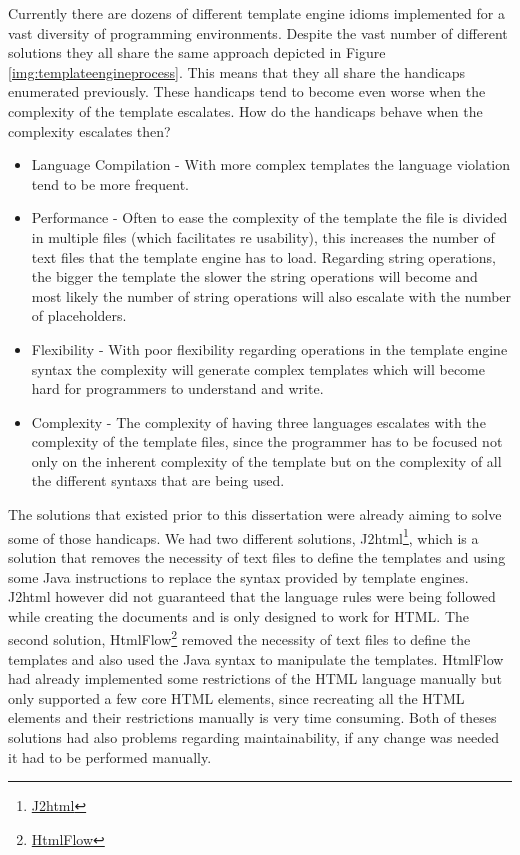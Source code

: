 \noindent
Currently there are dozens of different template engine idioms implemented for a vast diversity of programming environments. Despite the vast number of different solutions they all share the same approach depicted in Figure \ref{img:templateengineprocess}. This means that they all share the handicaps enumerated previously. These handicaps tend to become even worse when the complexity of the template escalates. How do the handicaps behave when the complexity escalates then?

\begin{itemize}
	\item Language Compilation - With more complex templates the language violation tend to be more frequent.
	\item Performance - Often to ease the complexity of the template the file is divided in multiple files (which facilitates re usability), this increases the number of text files that the template engine has to load. Regarding string operations, the bigger the template the slower the string operations will become and most likely the number of string operations will also escalate with the number of placeholders.
	\item Flexibility - With poor flexibility regarding operations in the template engine syntax the complexity will generate complex templates which will become hard for programmers to understand and write.
	\item Complexity - The complexity of having three languages escalates with the complexity of the template files, since the programmer has to be focused not only on the inherent complexity of the template but on the complexity of all the different syntaxs that are being used.
\end{itemize}

\noindent
The solutions that existed prior to this dissertation were already aiming to solve some of those handicaps. We had two different solutions, J2html\footnote{\href{https://j2html.com/}{J2html}}, which is a solution that removes the necessity of text files to define the templates and using some Java instructions to replace the syntax provided by template engines. J2html however did not guaranteed that the language rules were being followed while creating the documents and is only designed to work for \ac{HTML}. The second solution, HtmlFlow\footnote{\href{https://github.com/xmlet/HtmlFlow}{HtmlFlow}} removed the necessity of text files to define the templates and also used the Java syntax to manipulate the templates. HtmlFlow had already implemented some restrictions of the \ac{HTML} language manually but only supported a few core \ac{HTML} elements, since recreating all the \ac{HTML} elements and their restrictions manually is very time consuming. Both of theses solutions had also problems regarding maintainability, if any change was needed it had to be performed manually. 

